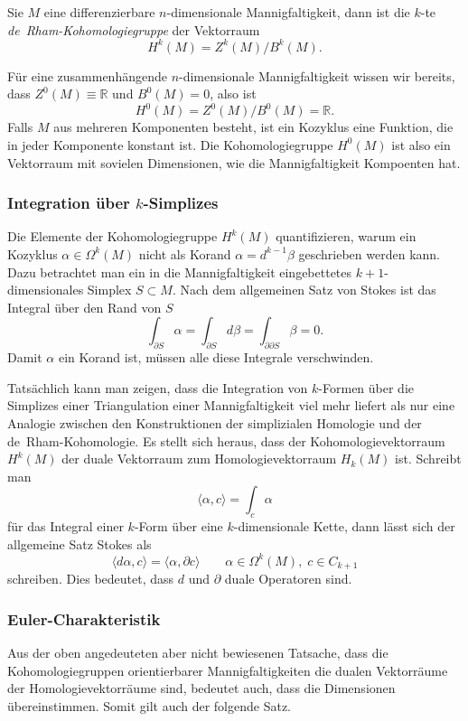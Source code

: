 \begin{definition}
Sie $M$ eine differenzierbare $n$-dimensionale Mannigfaltigkeit, dann
ist die $k$-te \emph{de~Rham-Kohomologiegruppe} der Vektorraum
%
\[
H^k(M)
=
Z^k(M) / B^k(M).
\]
\end{definition}

Für eine zusammenhängende $n$-dimensionale Mannigfaltigkeit wissen wir
bereits, dass $Z^0(M)\equiv\mathbb{R}$ und $B^0(M)=0$, also ist
\[
H^0(M) = Z^0(M) / B^0(M) = \mathbb{R}.
\]
Falls $M$ aus mehreren Komponenten besteht, ist ein Kozyklus eine
Funktion, die in jeder Komponente konstant ist.
Die Kohomologiegruppe $H^0(M)$ ist also ein Vektorraum mit sovielen
Dimensionen, wie die Mannigfaltigkeit Kompoenten hat.

%
%
\subsubsection{Integration über $k$-Simplizes}
Die Elemente der Kohomologiegruppe $H^k(M)$ quantifizieren, warum
ein Kozyklus $\alpha\in \Omega^k(M)$ nicht als Korand $\alpha=d^{k-1}\beta$
geschrieben werden kann.
Dazu betrachtet man ein in die Mannigfaltigkeit eingebettetes
$k+1$-dimensionales Simplex $S\subset M$.
Nach dem allgemeinen Satz von Stokes ist das Integral über den Rand von
$S$
\[
\int_{\partial S} \alpha
=
\int_{\partial S} d\beta
=
\int_{\partial\partial S}\beta
=
0.
\]
Damit $\alpha$ ein Korand ist, müssen alle diese Integrale verschwinden.

Tatsächlich kann man zeigen, dass die Integration von $k$-Formen über
die Simplizes einer Triangulation einer Mannigfaltigkeit viel mehr
liefert als nur eine Analogie zwischen den Konstruktionen der
simplizialen Homologie und der de~Rham-Kohomologie.
Es stellt sich heraus, dass der Kohomologievektorraum $H^k(M)$
der duale Vektorraum zum Homologievektorraum $H_k(M)$ ist.
Schreibt man
\[
\langle \alpha, c \rangle
=
\int_c \alpha
\]
für das Integral einer $k$-Form über eine $k$-dimensionale Kette, dann
lässt sich der allgemeine Satz Stokes als
\[
\langle d\alpha, c\rangle
=
\langle \alpha,\partial c\rangle
\qquad
\alpha\in \Omega^k(M),\; c\in C_{k+1}
\]
schreiben.
Dies bedeutet, dass $d$ und $\partial$ duale Operatoren sind.

%
%
\subsubsection{Euler-Charakteristik}
Aus der oben angedeuteten aber nicht bewiesenen Tatsache, dass die
Kohomologiegruppen orientierbarer Mannigfaltigkeiten die dualen
Vektorräume der Homologievektorräume sind, bedeutet auch, dass die 
Dimensionen übereinstimmen.
Somit gilt auch der folgende Satz.

